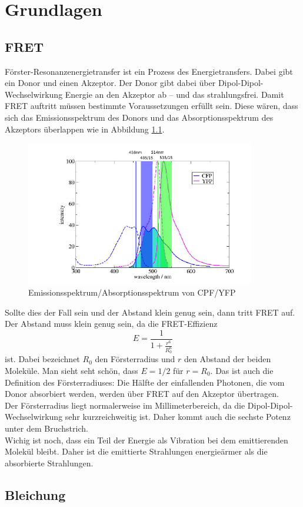 
\chapter{Grundlagen}

\section{FRET}

Förster-Resonanzenergietransfer ist ein Prozess des Energietransfers. Dabei gibt ein Donor und einen Akzeptor. Der Donor gibt dabei über Dipol-Dipol-Wechselwirkung 
Energie an den Akzeptor ab – und das strahlungsfrei.
Damit FRET auftritt müssen bestimmte Voraussetzungen erfüllt sein. Diese wären, dass sich das Emissionsspektrum des Donors und das Absorptionsspektrum des Akzeptors überlappen wie in  
Abbildung \ref{bild:FRETSpektrum}.

\begin{figure}[h]
    \centering
    \includegraphics[width = 10cm]{Bilder/Grundlagen/FRETSpektrum.png}
    \caption{Emissionsspektrum/Absorptionsspektrum von CPF/YFP}
    \label{bild:FRETSpektrum}
\end{figure}

Sollte dies der Fall sein und der Abstand klein genug sein, dann tritt FRET auf. \\
Der Abstand muss klein genug sein, da die FRET-Effizienz\\


\begin{equation}
    E = \frac{1}{1+\frac{r^6}{R_0^6}}
\end{equation}
ist. Dabei bezeichnet $R_0$ den Försterradius und $r$ den Abstand der beiden Moleküle. Man sieht seht schön, dass $E = 1/2$ für $r = R_0$. Das ist auch die 
Definition des Försterradiuses: Die Hälfte der einfallenden Photonen, die vom Donor absorbiert werden, werden über FRET auf den Akzeptor übertragen.\\
Der Försterradius liegt normalerweise im Millimeterbereich, da die Dipol-Dipol-Wechselwirkung sehr kurzreichweitig ist. Daher kommt auch die sechste Potenz unter dem Bruchstrich.\\
Wichig ist noch, dass ein Teil der Energie als Vibration bei dem emittierenden Molekül bleibt. Daher ist die emittierte Strahlungen energieärmer als die absorbierte Strahlungen.


\section{Bleichung}